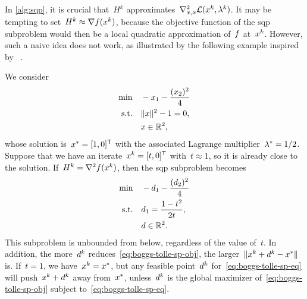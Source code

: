 In \cref{alg:sqp}, it is crucial that~$H^k$ approximates~$\nabla_{x, x}^2 \lag(\iter[k], \lm[k])$.
It may be tempting to set~$H^k \approx \nabla \obj(\iter[k])$, because the objective function of the \gls{sqp} subproblem would then be a local quadratic approximation of~$f$ at~$\iter[k]$.
However, such a naive idea does not work, as illustrated by the following example inspired by \citeauthor{Boggs_Tolle_1995}~\cite[\S~2.2]{Boggs_Tolle_1995}.

We consider
\begin{align*}
    \min        & \quad -\iter_1 - \frac{(\iter_2)^2}{4}\\
    \text{s.t.} & \quad \norm{\iter}^2 - 1 = 0,\\
                & \quad \iter \in \R^2,
\end{align*}
whose solution is~$\iter[\ast] = [1, 0]^{\T}$ with the associated Lagrange multiplier~$\lm[\ast] = 1/2$.
Suppose that we have an iterate~$\iter[k] = [t, 0]^{\T}$ with~$t \approx 1$, so it is already close to the solution.
If~$H^k = \nabla^2 \obj(\iter[k])$, then the \gls{sqp} subproblem becomes
\begin{subequations}
    \begin{align}
        \min        & \quad -\step_1 - \frac{(\step_2)^2}{4} \label{eq:boggs-tolle-sp-obj}\\
        \text{s.t.} & \quad \step_1 = \frac{1 - t^2}{2 t}, \label{eq:boggs-tolle-sp-eq}\\
                    & \quad \step \in \R^2. \nonumber
    \end{align}
\end{subequations}
This subproblem is unbounded from below, regardless of the value of~$t$.
In addition, the more~$\step[k]$ reduces~\cref{eq:boggs-tolle-sp-obj}, the larger~$\norm{\iter[k] + \step[k] - \iter[\ast]}$ is.
If~$t = 1$, we have~$\iter[k] = \iter[\ast]$, but any feasible point~$\step[k]$ for~\cref{eq:boggs-tolle-sp-eq} will push~$\iter[k] + \step[k]$ away from~$\iter[\ast]$, unless~$\step[k]$ is the global maximizer of~\cref{eq:boggs-tolle-sp-obj} subject to~\cref{eq:boggs-tolle-sp-eq}.

